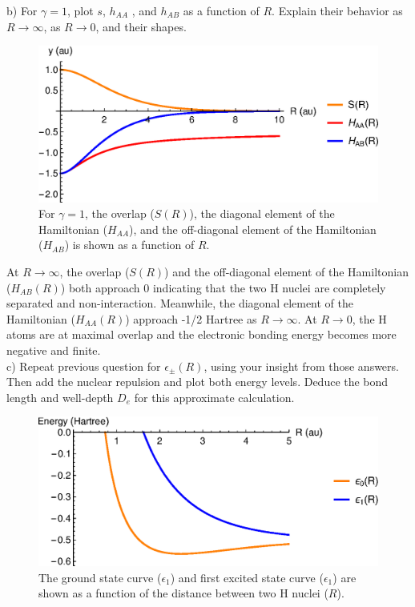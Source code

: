 \documentclass{article}
\begin{document}
\noindent b) For $\gamma=1$, plot $s$, $h_{AA}$ , and $h_{AB}$ as a function
of $R$. Explain their behavior as $R\rightarrow \infty$, as $R\rightarrow 0$,
and their shapes.

\begin{figure}[H]
  \centering
  \includegraphics[scale=0.75]{h2_cation.eps}
  \caption{For $\gamma=1$, the overlap ($S(R)$),
    the diagonal element of the Hamiltonian ($H_{AA}$), and the off-diagonal
    element of the Hamiltonian ($H_{AB}$) is shown as a function of $R$.}
  \label{fig:mat_elem}
\end{figure}

{\color{blue}
  At $R\rightarrow \infty$, the overlap ($S(R)$) and the off-diagonal element of the
  Hamiltonian ($H_{AB}(R)$) both approach 0 indicating that the two H nuclei are completely
  separated and non-interaction. Meanwhile, the diagonal element of the Hamiltonian
  ($H_{AA}(R)$) approach -1/2 Hartree as $R\rightarrow\infty$. At $R\rightarrow 0$,
  the H atoms are at maximal overlap and the electronic bonding energy becomes more negative
  and finite.}
\\

\noindent c) Repeat previous question for $\epsilon_{\pm}(R)$, using your insight from
those answers. Then add the nuclear repulsion and plot both energy levels. Deduce the
bond length and well-depth $D_e$ for this approximate calculation.

\begin{figure}[H]
  \centering 
  \includegraphics[scale=0.75]{h2_cat_curve.eps}
  \caption{The ground state curve ($\epsilon_1$) and first excited
    state curve ($\epsilon_1$) are shown as a function of
    the distance between two H nuclei ($R$).}
  \label{fig:cat_curve}
\end{figure}
\end{document}
